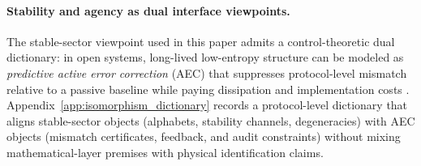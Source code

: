 \paragraph{Stability and agency as dual interface viewpoints.}
The stable-sector viewpoint used in this paper admits a control-theoretic dual dictionary: in open systems, long-lived low-entropy structure can be modeled as \emph{predictive active error correction} (AEC) that suppresses protocol-level mismatch relative to a passive baseline while paying dissipation and implementation costs \cite{AstromMurray2008FeedbackSystems,Landauer1961}.
Appendix~\ref{app:isomorphism_dictionary} records a protocol-level dictionary that aligns stable-sector objects (alphabets, stability channels, degeneracies) with AEC objects (mismatch certificates, feedback, and audit constraints) without mixing mathematical-layer premises with physical identification claims.



